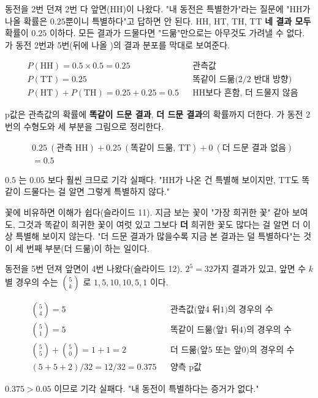 동전을 2번 던져 2번 다 앞면(HH)이 나왔다. "내 동전은 특별한가"라는 질문에
"HH가 나올 확률은 $0.25$뿐이니 특별하다"고 답하면 안 된다. HH, HT, TH, TT
\textbf{네 결과 모두} 확률이 $0.25$ 이하다. 모든 결과가 드물다면 "드묾"만으로는
아무것도 가려낼 수 없다. 가 동전 2번과 5번(뒤에 나올
)의 결과 분포를 막대로 보여준다.

\begin{align*}
  &P(\text{HH}) = 0.5\times0.5 = 0.25 && \text{관측값}\\
  &P(\text{TT}) = 0.25 && \text{똑같이 드묾(2/2 반대 방향)}\\
  &P(\text{HT})+P(\text{TH}) = 0.25+0.25 = 0.5 && \text{HH보다 흔함, 더 드물지 않음}
\end{align*}

p값은 관측값의 확률에 \textbf{똑같이 드문 결과}, \textbf{더 드문 결과}의
확률까지 더한다. 가 동전 2번의 수형도와 세
부분을 그림으로 정리한다.

\begin{align*}
  &0.25\ (\text{관측 HH}) + 0.25\ (\text{똑같이 드묾, TT}) + 0\ (\text{더 드문 결과 없음}) \\
  &= 0.5
\end{align*}

$0.5$ 는 $0.05$ 보다 훨씬 크므로 기각 실패다. "HH가 나온 건 특별해 보이지만,
TT도 똑같이 드물다는 걸 알면 그렇게 특별하지 않다."

꽃에 비유하면 이해가 쉽다(슬라이드 11). 지금 보는 꽃이 "가장 희귀한 꽃"
같아 보여도, 그것과 똑같이 희귀한 꽃이 여럿 있고 그보다 \textbf{더} 희귀한
꽃도 많다는 걸 알면 더 이상 특별해 보이지 않는다. "더 드문 결과가 많을수록
지금 본 결과는 덜 특별하다"는 것이 세 번째 부분(더 드묾)이 하는 일이다.

\begin{example}[동전 5번 중 앞면 4번]
\label{ex:pv-coin5}
동전을 5번 던져 앞면이 4번 나왔다(슬라이드 12). $2^5=32$가지 결과가 있고,
앞면 수 $k$ 별 경우의 수는 $\binom{5}{k}$ 로 $1,5,10,10,5,1$ 이다.

\begin{align*}
  &\binom{5}{4} = 5 && \text{관측값(앞4 뒤1)의 경우의 수}\\
  &\binom{5}{1} = 5 && \text{똑같이 드묾(앞1 뒤4)의 경우의 수}\\
  &\binom{5}{5}+\binom{5}{0} = 1+1 = 2 && \text{더 드묾(앞5 또는 앞0)의 경우의 수}\\
  &(5+5+2)/32 = 12/32 = 0.375 && \text{양측 p값}
\end{align*}

$0.375 > 0.05$ 이므로 기각 실패다. "내 동전이 특별하다는 증거가 없다."
\end{example}

